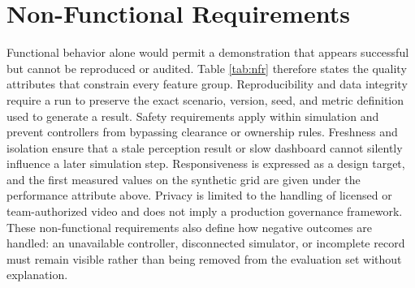 \section{Non-Functional Requirements}

Functional behavior alone would permit a demonstration that appears successful but cannot be reproduced or audited. Table \ref{tab:nfr} therefore states the quality attributes that constrain every feature group. Reproducibility and data integrity require a run to preserve the exact scenario, version, seed, and metric definition used to generate a result. Safety requirements apply within simulation and prevent controllers from bypassing clearance or ownership rules. Freshness and isolation ensure that a stale perception result or slow dashboard cannot silently influence a later simulation step. Responsiveness is expressed as a design target, and the first measured values on the synthetic grid are given under the performance attribute above. Privacy is limited to the handling of licensed or team-authorized video and does not imply a production governance framework. These non-functional requirements also define how negative outcomes are handled: an unavailable controller, disconnected simulator, or incomplete record must remain visible rather than being removed from the evaluation set without explanation.


